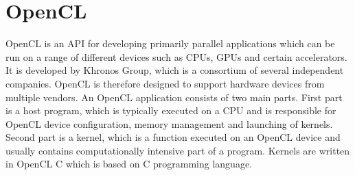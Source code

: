 \documentclass
[
    digital, %
    oneside, %
    table, %
    nolof, %
    nolot, %
    nocover %
]{fithesis3}
\begin{document}
\section{OpenCL}
OpenCL is an API for developing primarily parallel applications which can be run on a range of different devices such as CPUs, GPUs and certain
accelerators. It is developed by Khronos Group, which is a consortium of several independent companies. OpenCL is therefore designed to support
hardware devices from multiple vendors. An OpenCL application consists of two main parts. First part is a host program, which is typically executed on
a CPU and is responsible for OpenCL device configuration, memory management and launching of kernels. Second part is a kernel, which is a function
executed on an OpenCL device and usually contains computationally intensive part of a program. Kernels are written in OpenCL C which is based on C
programming language.
\end{document}
